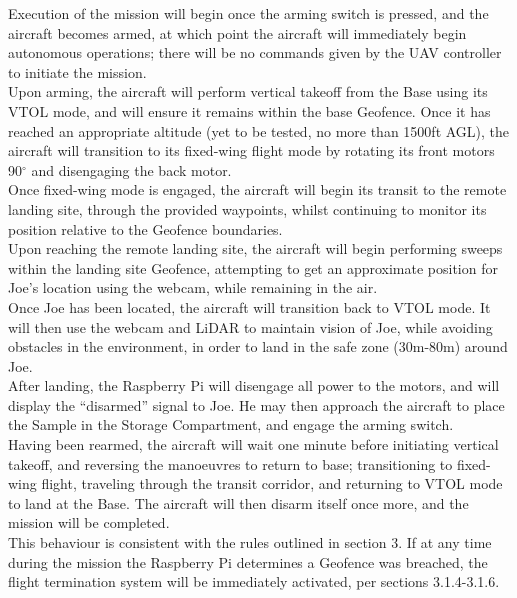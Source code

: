 Execution of the mission will begin once the arming switch is pressed, and the aircraft becomes armed, at which point the aircraft will immediately begin autonomous operations; there will be no commands given by the UAV controller to initiate the mission.\\

Upon arming, the aircraft will perform vertical takeoff from the Base using its VTOL mode, and will ensure it remains within the base Geofence. Once it has reached an appropriate altitude (yet to be tested, no more than 1500ft AGL), the aircraft will transition to its fixed-wing flight mode by rotating its front motors 90$^\circ$ and disengaging the back motor.\\

Once fixed-wing mode is engaged, the aircraft will begin its transit to the remote landing site, through the provided waypoints, whilst continuing to monitor its position relative to the Geofence boundaries.\\

Upon reaching the remote landing site, the aircraft will begin performing sweeps within the landing site Geofence, attempting to get an approximate position for Joe's location using the webcam, while remaining in the air.\\

Once Joe has been located, the aircraft will transition back to VTOL mode. It will then use the webcam and LiDAR to maintain vision of Joe, while avoiding obstacles in the environment, in order to land in the safe zone (30m-80m) around Joe.\\

After landing, the Raspberry Pi will disengage all power to the motors, and will display the ``disarmed'' signal to Joe. He may then approach the aircraft to place the Sample in the Storage Compartment, and engage the arming switch.\\

Having been rearmed, the aircraft will wait one minute before initiating vertical takeoff, and reversing the manoeuvres to return to base; transitioning to fixed-wing flight, traveling through the transit corridor, and returning to VTOL mode to land at the Base. The aircraft will then disarm itself once more, and the mission will be completed.\\

This behaviour is consistent with the rules outlined in section 3. If at any time during the mission the Raspberry Pi determines a Geofence was breached, the flight termination system will be immediately activated, per sections 3.1.4-3.1.6.